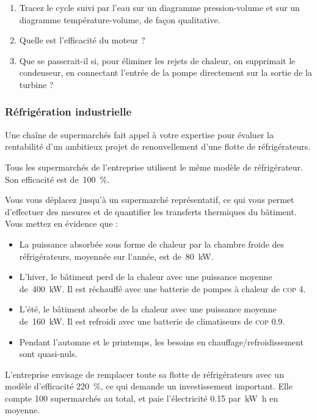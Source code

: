	\begin{enumerate}
		\item Tracez le cycle suivi par l’eau sur un diagramme pression-volume et sur un diagramme température-volume, de façon qualitative.
		\item Quelle est l’efficacité du moteur ?
		\item Que se passerait-il si, pour éliminer les rejets de chaleur, on supprimait le condenseur, en connectant l’entrée de la pompe directement sur la sortie de la turbine ?
	\end{enumerate}


\subsubsection{Réfrigération industrielle}
\label{exo_refrigeration_supermache}

	Une chaîne de supermarchés fait appel à votre expertise pour évaluer la rentabilité d’un ambitieux projet de renouvellement d’une flotte de réfrigérateurs.
	
	Tous les supermarchés de l’entreprise utilisent le même modèle de réfrigérateur. Son efficacité est de~\SI{100}{\percent}.
	
	Vous vous déplacez jusqu’à un supermarché représentatif, ce qui vous permet d’effectuer des mesures et de quantifier les transferts thermiques du bâtiment. Vous mettez en évidence que :
	
	\begin{itemize}
		\item La puissance absorbée sous forme de chaleur par la chambre froide des réfrigérateurs, moyennée sur l’année, est de~\SI{80}{\kilo\watt}.
		\item L’hiver, le bâtiment perd de la chaleur avec une puissance moyenne de~\SI{400}{\kilo\watt}. Il est réchauffé avec une batterie de pompes à chaleur de \textsc{cop} \num{4}.
		\item L’été, le bâtiment absorbe de la chaleur avec une puissance moyenne de~\SI{160}{\kilo\watt}. Il est refroidi avec une batterie de climatiseurs de \textsc{cop} \num{0,9}.
		\item Pendant l’automne et le printemps, les besoins en chauffage/refroidissement sont quasi-nuls.
	\end{itemize}
	
	L’entreprise envisage de remplacer toute sa flotte de réfrigérateurs avec un modèle d’efficacité \SI{220}{\percent}, ce qui demande un investissement important. Elle compte 100 supermarchés au total, et paie l’électricité \SI{0,15}{\euroo} par~\si{\kilo\watt\hour} en moyenne.
	
